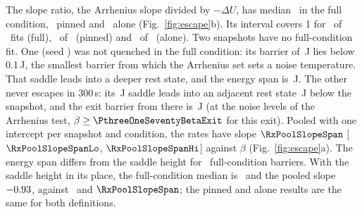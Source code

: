 The slope ratio, the Arrhenius slope divided by $-\Delta U$, has median \PthreeRatioFullSpan\ in the full condition, \EfourRatioFrozen\ pinned and \EfourRatioAlone\ alone (Fig.~\ref{fig:escape}b). Its interval covers 1 for \RxEfourCoverFullSpan\ of \RxEfourFitsFullSpan\ fits (full), \EfourCoverFrozen\ of \EfourFitsFrozen\ (pinned) and \EfourCoverAlone\ of \EfourFitsAlone\ (alone). Two snapshots have no full-condition fit. One (seed \RzCSkipSeed) was not quenched in the full condition: its barrier of \PthreeSixtyRep\,J lies below 0.1\,J, the smallest barrier from which the Arrhenius set sets a noise temperature. That saddle leads into a deeper rest state, and the energy span is \PthreeSixtySpan\,J. The other never escapes in 300\,s: its \EfourSeedOneSeventyDU\,J saddle leads into an adjacent rest state \RzMiscSeventyBelow\,J below the snapshot, and the exit barrier from there is \PthreeOneSeventySpan\,J (at the noise levels of the Arrhenius test, $\beta\ge\PthreeOneSeventyBetaExit$ for this exit). Pooled with one intercept per snapshot and condition, the rates have slope $\RxPoolSlopeSpan$ [$\RxPoolSlopeSpanLo$, $\RxPoolSlopeSpanHi$] against $\beta$ (Fig.~\ref{fig:escape}a). The energy span differs from the saddle height for \RxSpanAffFull\ full-condition barriers. With the saddle height in its place, the full-condition median is \PphysRatioFull\ and the pooled slope $-0.93$, against \PthreeRatioFullSpan\ and $\RxPoolSlopeSpan$; the pinned and alone results are the same for both definitions.

